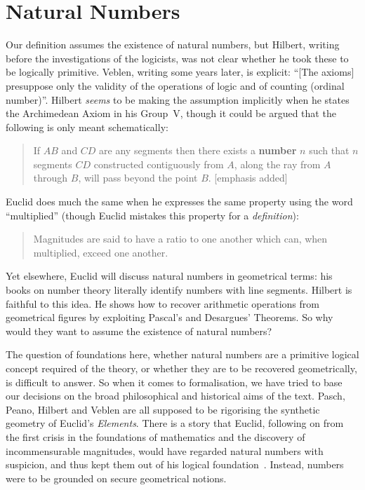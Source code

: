\section{Natural Numbers}
Our definition assumes the existence of natural numbers, but Hilbert, writing before the investigations of the logicists, was not clear whether he took these to be logically primitive. Veblen, writing some years later, is explicit: ``[The axioms] presuppose only the validity of the operations of logic and of counting (ordinal number)''. Hilbert \emph{seems} to be making the assumption implicitly when he states the Archimedean Axiom in his Group~V, though it could be argued that the following is only meant schematically:
\begin{quote}
  If $AB$ and $CD$ are any segments then there exists a \textbf{number} $n$ such that $n$ segments $CD$ constructed contiguously from $A$, along the ray from $A$ through $B$, will pass beyond the point $B$.
[emphasis added]\end{quote}

Euclid does much the same when he expresses the same property using the word ``multiplied'' (though Euclid mistakes this property for a \emph{definition}):
\begin{quote}
  Magnitudes are said to have a ratio to one another which can, when multiplied, exceed one another.\cite{Aleph0Elements}
\end{quote}

Yet elsewhere, Euclid will discuss natural numbers in geometrical terms: his books on number theory literally identify numbers with line segments. Hilbert is faithful to this idea. He shows how to recover arithmetic operations from geometrical figures by exploiting Pascal's and Desargues' Theorems. So why would they want to assume the existence of natural numbers?

The question of foundations here, whether natural numbers are a primitive logical concept required of the theory, or whether they are to be recovered geometrically, is difficult to answer. So when it comes to formalisation, we have tried to base our decisions on the broad philosophical and historical aims of the text. Pasch, Peano, Hilbert and Veblen are all supposed to be rigorising the synthetic geometry of Euclid's \emph{Elements}. There is a story that Euclid, following on from the first crisis in the foundations of mathematics and the discovery of incommensurable magnitudes, would have regarded natural numbers with suspicion, and thus kept them out of his logical foundation~\cite{EvolutionEuclideanElements}. Instead, numbers were to be grounded on secure geometrical notions.

